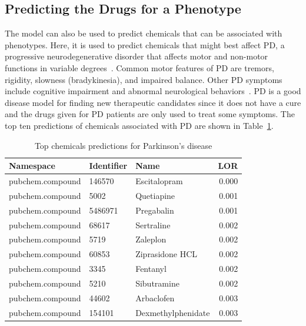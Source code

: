 \subsection{Predicting the Drugs for a Phenotype}

The model can also be used to predict chemicals that can be associated with phenotypes.
Here, it is used to predict chemicals that might best affect \ac{PD}, a progressive neurodegenerative disorder that affects motor and non-motor functions in variable degrees~\cite{jankovic_parkinsons_2008}.
Common motor features of \ac{PD} are tremors, rigidity, slowness (bradykinesia), and impaired balance.
Other \ac{PD} symptoms include cognitive impairment and abnormal neurological behaviors~\cite{jankovic_parkinsons_2008}. 
\ac{PD} is a good disease model for finding new therapeutic candidates since it does not have a cure and the drugs given for \ac{PD} patients are only used to treat some symptoms.
The top ten predictions of chemicals associated with \ac{PD} are shown in Table~\ref{tab:phenotype_drug}.

\begin{table}[!hb]
    \centering
    \begin{tabular}{|l|l|l|r|}
        \hline
        \textbf{Namespace} & \textbf{Identifier} & \textbf{Name} & \textbf{LOR} \\
        \hline
        pubchem.compound & 146570 & Escitalopram & 0.000 \\
        \hline
        pubchem.compound & 5002 & Quetiapine & 0.001 \\
        \hline
        pubchem.compound & 5486971 & Pregabalin & 0.001 \\
        \hline
        pubchem.compound & 68617 & Sertraline & 0.002 \\
        \hline
        pubchem.compound & 5719 & Zaleplon & 0.002  \\
        \hline
        pubchem.compound & 60853 & Ziprasidone HCL & 0.002 \\
        \hline
        pubchem.compound & 3345 & Fentanyl & 0.002  \\
        \hline
        pubchem.compound & 5210 & Sibutramine & 0.002 \\
        \hline
        pubchem.compound & 44602 & Arbaclofen & 0.003 \\
        \hline
        pubchem.compound & 154101 & Dexmethylphenidate & 0.003 \\
        \hline
    \end{tabular}
    \captionsetup{justification=centering}
    \caption{Top chemicals predictions for Parkinson's disease}
    \label{tab:phenotype_drug}
\end{table}

